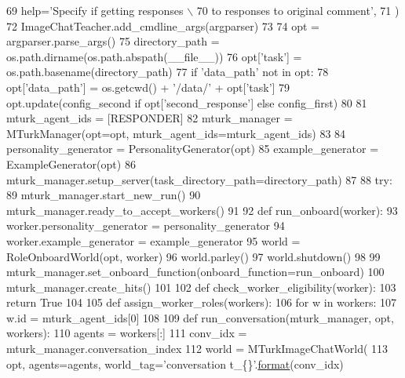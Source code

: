 \begin{DoxyCode}
69         help=\textcolor{stringliteral}{'Specify if getting responses \(\backslash\)}
70 \textcolor{stringliteral}{                           to responses to original comment'},
71     )
72     ImageChatTeacher.add\_cmdline\_args(argparser)
73 
74     opt = argparser.parse\_args()
75     directory\_path = os.path.dirname(os.path.abspath(\_\_file\_\_))
76     opt[\textcolor{stringliteral}{'task'}] = os.path.basename(directory\_path)
77     \textcolor{keywordflow}{if} \textcolor{stringliteral}{'data\_path'} \textcolor{keywordflow}{not} \textcolor{keywordflow}{in} opt:
78         opt[\textcolor{stringliteral}{'data\_path'}] = os.getcwd() + \textcolor{stringliteral}{'/data/'} + opt[\textcolor{stringliteral}{'task'}]
79     opt.update(config\_second \textcolor{keywordflow}{if} opt[\textcolor{stringliteral}{'second\_response'}] \textcolor{keywordflow}{else} config\_first)
80 
81     mturk\_agent\_ids = [RESPONDER]
82     mturk\_manager = MTurkManager(opt=opt, mturk\_agent\_ids=mturk\_agent\_ids)
83 
84     personality\_generator = PersonalityGenerator(opt)
85     example\_generator = ExampleGenerator(opt)
86     mturk\_manager.setup\_server(task\_directory\_path=directory\_path)
87 
88     \textcolor{keywordflow}{try}:
89         mturk\_manager.start\_new\_run()
90         mturk\_manager.ready\_to\_accept\_workers()
91 
92         \textcolor{keyword}{def }run\_onboard(worker):
93             worker.personality\_generator = personality\_generator
94             worker.example\_generator = example\_generator
95             world = RoleOnboardWorld(opt, worker)
96             world.parley()
97             world.shutdown()
98 
99         mturk\_manager.set\_onboard\_function(onboard\_function=run\_onboard)
100         mturk\_manager.create\_hits()
101 
102         \textcolor{keyword}{def }check\_worker\_eligibility(worker):
103             \textcolor{keywordflow}{return} \textcolor{keyword}{True}
104 
105         \textcolor{keyword}{def }assign\_worker\_roles(workers):
106             \textcolor{keywordflow}{for} w \textcolor{keywordflow}{in} workers:
107                 w.id = mturk\_agent\_ids[0]
108 
109         \textcolor{keyword}{def }run\_conversation(mturk\_manager, opt, workers):
110             agents = workers[:]
111             conv\_idx = mturk\_manager.conversation\_index
112             world = MTurkImageChatWorld(
113                 opt, agents=agents, world\_tag=\textcolor{stringliteral}{'conversation t\_\{\}'}.\hyperlink{namespaceparlai_1_1chat__service_1_1services_1_1messenger_1_1shared__utils_a32e2e2022b824fbaf80c747160b52a76}{format}(conv\_idx)

\end{DoxyCode}
